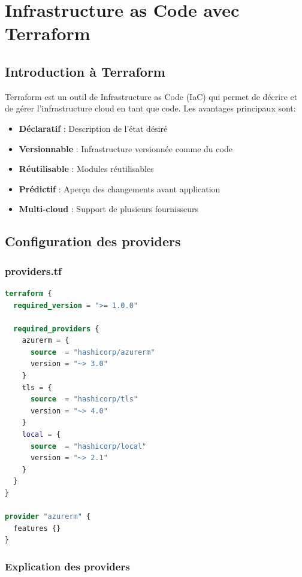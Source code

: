 \documentclass[12pt,a4paper,twoside]{report}
\begin{document}
\newpage

\chapter{Infrastructure as Code avec Terraform}

\section{Introduction à Terraform}

Terraform est un outil de Infrastructure as Code (IaC) qui permet de décrire et de gérer l'infrastructure cloud en tant que code. Les avantages principaux sont:

\begin{itemize}
    \item \textbf{Déclaratif} : Description de l'état désiré
    \item \textbf{Versionnable} : Infrastructure versionnée comme du code
    \item \textbf{Réutilisable} : Modules réutilisables
    \item \textbf{Prédictif} : Aperçu des changements avant application
    \item \textbf{Multi-cloud} : Support de plusieurs fournisseurs
\end{itemize}

\section{Configuration des providers}

\subsection{providers.tf}

\begin{lstlisting}[language=terraform]
terraform {
  required_version = ">= 1.0.0"

  required_providers {
    azurerm = {
      source  = "hashicorp/azurerm"
      version = "~> 3.0"
    }
    tls = {
      source  = "hashicorp/tls"
      version = "~> 4.0"
    }
    local = {
      source  = "hashicorp/local"
      version = "~> 2.1"
    }
  }
}

provider "azurerm" {
  features {}
}
\end{lstlisting}

\subsection{Explication des providers}
\end{document}
